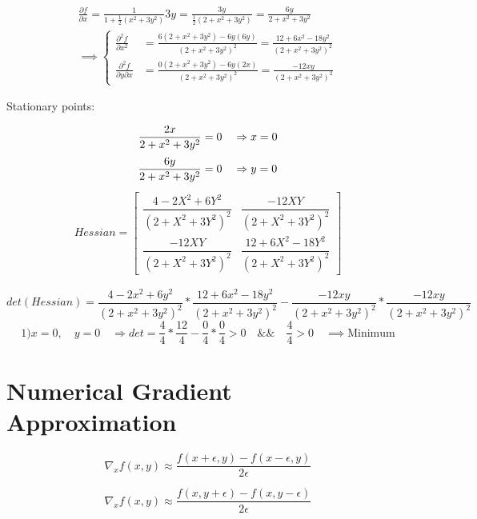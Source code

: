 \documentclass[12pt]{article}         %
\begin{document}
$$
\begin{aligned}
\frac {\partial f}{\partial x} = \frac{1}{1+\frac{1}{2}(x^2+3y^2)}3y= \frac{3y}{\frac{1}{2}(2+x^2+3y^2)}=\frac{6y}{2+x^2+3y^2}\\
\implies 
	\left\{
	\begin{aligned}
		\frac {\partial^2 f}{\partial x^2}&=\frac{6(2+x^2+3y^2)-6y(6y)}{(2+x^2+3y^2)^2}=
		 	\frac{12+6x^2-18y^2}{(2+x^2+3y^2)^2} \\
		\frac {\partial^2 f}{\partial y \partial x}&=\frac{0(2+x^2+3y^2)-6y(2x)}{(2+x^2+3y^2)^2}=
		 	\frac{-12xy}{(2+x^2+3y^2)^2} 
	 \end{aligned} 
	 \right.
\end{aligned}
$$

Stationary points:

$$
\frac{2x}{2+x^2+3y^2}=0 \quad\Rightarrow x=0\\
$$
$$
\frac{6y}{2+x^2+3y^2}=0 \quad\Rightarrow y=0\\
$$
\begin{gather}
Hessian = 
  \begin{bmatrix}
   \dfrac{4 - 2X^2 +6Y^2}{(2 + X^2 + 3Y^2)^2} &
   \dfrac{-12XY}{(2 + X^2 + 3Y^2)^2}\\
   \dfrac{-12XY}{(2 + X^2 + 3Y^2)^2} &
   \dfrac{12 + 6X^2 - 18Y^2}{(2 + X^2 + 3Y^2)^2} 
   \end{bmatrix}
    \nonumber
\end{gather}

$$
det(Hessian)=\frac{4-2x^2+6y^2}{(2+x^2+3y^2)^2} * \frac{12+6x^2-18y^2}{(2+x^2+3y^2)^2} - \frac{-12xy}{(2+x^2+3y^2)^2} *  \frac{-12xy}{(2+x^2+3y^2)^2}
$$
$$
1) x=0, \quad y=0 \quad\Rightarrow det=\frac{4}{4}*\frac{12}{4}-\frac{0}{4}*\frac{0}{4} > 0  \quad \&\& \quad \frac{4}{4} > 0 \quad\implies \text{Minimum}
$$



\section{Numerical Gradient Approximation}


\begin{equation}
	\nabla_x f(x,y) \approx \dfrac{f(x + \epsilon, y) - f(x - \epsilon, y)}{2\epsilon}
\end{equation}

\begin{equation}
	\nabla_x f(x,y) \approx \dfrac{f(x, y + \epsilon) - f(x, y - \epsilon)}{2\epsilon}
\end{equation}
\end{document}
